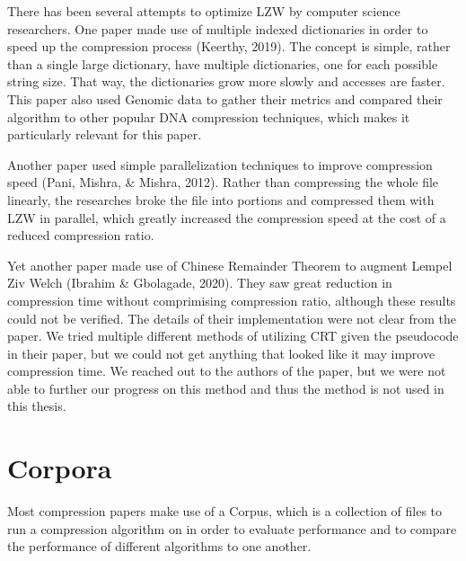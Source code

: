 \documentclass[12pt,twoside]{reedthesis}
\begin{document}
There has been several attempts to optimize LZW by computer science researchers. One paper made use of multiple indexed dictionaries in order to speed up the compression process (Keerthy, 2019). The concept is simple, rather than a single large dictionary, have multiple dictionaries, one for each possible string size. That way, the dictionaries grow more slowly and accesses are faster. This paper also used Genomic data to gather their metrics and compared their algorithm to other popular DNA compression techniques, which makes it particularly relevant for this paper.

Another paper used simple parallelization techniques to improve compression speed (Pani, Mishra, \& Mishra, 2012). Rather than compressing the whole file linearly, the researches broke the file into portions and compressed them with LZW in parallel, which greatly increased the compression speed at the cost of a reduced compression ratio.

Yet another paper made use of Chinese Remainder Theorem to augment Lempel Ziv Welch (Ibrahim \& Gbolagade, 2020). They saw great reduction in compression time without comprimising compression ratio, although these results could not be verified. The details of their implementation were not clear from the paper. We tried multiple different methods of utilizing CRT given the pseudocode in their paper, but we could not get anything that looked like it may improve compression time. We reached out to the authors of the paper, but we were not able to further our progress on this method and thus the method is not used in this thesis.

\hypertarget{corpora}{%
\section{Corpora}\label{corpora}}

Most compression papers make use of a Corpus, which is a collection of files to run a compression algorithm on in order to evaluate performance and to compare the performance of different algorithms to one another.
\end{document}
